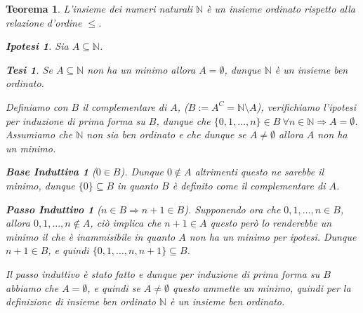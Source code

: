 \documentclass{article}
\makeatletter
\renewenvironment{proof}[1][\proofname]{\par
    \pushQED{\qed}%
    \normalfont \topsep6\p@\@plus6\p@\relax
    \trivlist
    \item\relax
    {\itshape
    #1\@addpunct{.}}\hspace\labelsep\ignorespaces
    }{%
    \popQED\endtrivlist\@endpefalse
}
\newtheorem{theorem}{Teorema}[part]
\newtheorem{ipothesis}[lemma]{Ipotesi}
\newtheorem{thesis}[lemma]{Tesi}
\theoremstyle{definition}
\newtheorem*{base}{Base Induttiva}
\newtheorem*{step}{Passo Induttivo}
\makeatother
\begin{document}
        \begin{theorem}
            L'insieme dei numeri naturali $\mathbb{N}$ è un insieme ordinato rispetto alla relazione d'ordine $\leq$.
            \begin{ipothesis}
                Sia \(A \subseteq \mathbb{N}\).
            \end{ipothesis}
            \begin{thesis}
                Se \(A \subseteq \mathbb{N}\) non ha un minimo allora \(A=\emptyset\), dunque \(\mathbb{N}\) è un insieme ben ordinato.
            \end{thesis}
            \begin{proof}
                Definiamo con \(B\) il complementare di \(A\), (\(B:=A^C=\mathbb{N}\setminus A\)), verifichiamo l'ipotesi per induzione di prima forma su \(B\), dunque che \(\{0,1,\ldots,n\}\in B\ \forall n\in\mathbb{N}\Rightarrow A = \emptyset\).
                Assumiamo che \(\mathbb{N}\) non sia ben ordinato e che dunque se \(A\neq\emptyset\) allora \(A\) non ha un minimo.
                \begin{base}[$0\in B$]
                    Dunque \(0\notin A\) altrimenti questo ne sarebbe il minimo, dunque \(\{0\}\subseteq B\) in quanto \(B\) è definito come il complementare di \(A\).\checkmark
                \end{base}
                \begin{step}[$n\in B\Rightarrow n+1\in B$]
                    Supponendo ora che \(0,1,\ldots,n\in B\), allora \(0,1,\ldots,n\notin A\), ciò implica che \(n+1\in A\) questo però lo renderebbe un minimo il che è inammisibile in quanto \(A\) non ha un minimo per ipotesi. Dunque \(n+1\in B\), e quindi \(\{0,1,\ldots,n,n+1\}\subseteq B\).\checkmark
                \end{step}
                Il passo induttivo è stato fatto e dunque per induzione di prima forma su \(B\) abbiamo che \(A=\emptyset\), e quindi se \(A\neq\emptyset\) questo ammette un minimo, quindi per la definizione di insieme ben ordinato \(\mathbb{N}\) è un insieme ben ordinato.
                \pushQED{}
            \end{proof}
            \raggedleft{\ensuremath{\blacksquare}}
        \end{theorem}
\end{document}
